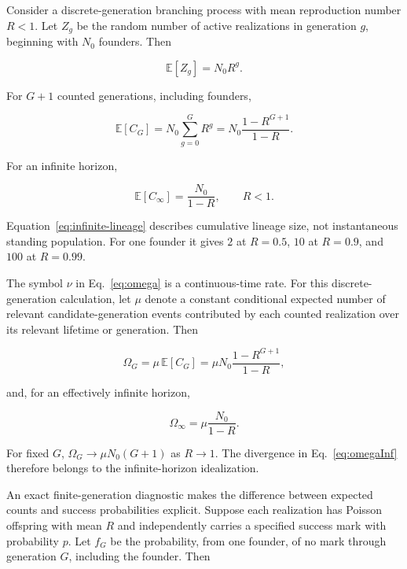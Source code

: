 \documentclass[11pt,a4paper]{article}
\begin{document}
Consider a discrete-generation branching process with mean reproduction number $R<1$. Let $Z_g$ be the random number of active realizations in generation $g$, beginning with $N_0$ founders. Then

\[
\mathbb E[Z_g]=N_0R^g.
\]

For $G+1$ counted generations, including founders,

\begin{equation}
\mathbb E[C_G]
=
N_0\sum_{g=0}^{G}R^g
=
N_0\frac{1-R^{G+1}}{1-R}.
\label{eq:finite-lineage}
\end{equation}

For an infinite horizon,

\begin{equation}
\mathbb E[C_\infty]
=
\frac{N_0}{1-R},
\qquad R<1.
\label{eq:infinite-lineage}
\end{equation}

Equation~\eqref{eq:infinite-lineage} describes cumulative lineage size, not instantaneous standing population. For one founder it gives $2$ at $R=0.5$, $10$ at $R=0.9$, and $100$ at $R=0.99$.

The symbol $\nu$ in Eq.~\eqref{eq:omega} is a continuous-time rate. For this discrete-generation calculation, let $\mu$ denote a constant conditional expected number of relevant candidate-generation events contributed by each counted realization over its relevant lifetime or generation. Then

\begin{equation}
\Omega_G
=
\mu\,\mathbb E[C_G]
=
\mu N_0\frac{1-R^{G+1}}{1-R},
\label{eq:omegaG}
\end{equation}

and, for an effectively infinite horizon,

\begin{equation}
\Omega_\infty
=
\mu\frac{N_0}{1-R}.
\label{eq:omegaInf}
\end{equation}

For fixed $G$, $\Omega_G\to\mu N_0(G+1)$ as $R\to1$. The divergence in Eq.~\eqref{eq:omegaInf} therefore belongs to the infinite-horizon idealization.

An exact finite-generation diagnostic makes the difference between expected counts and success probabilities explicit. Suppose each realization has Poisson offspring with mean $R$ and independently carries a specified success mark with probability $p$. Let $f_G$ be the probability, from one founder, of no mark through generation $G$, including the founder. Then
\end{document}
